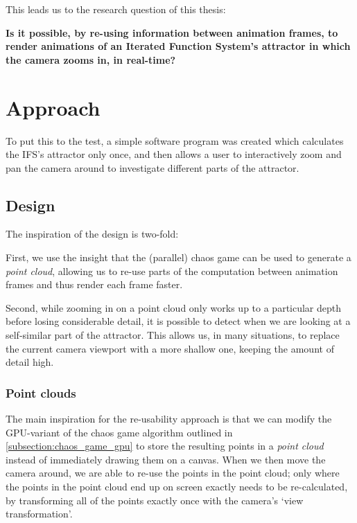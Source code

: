 \documentclass[11pt]{article}
\begin{document}
This leads us to the research question of this thesis:

\textbf{\textbf{Is it possible, by re-using information between animation frames, 
to render animations of an Iterated Function System's attractor in which the camera zooms in, in real-time?}}

\section{Approach}
\label{sec:orga42fad4}
\label{section:approach}

To put this to the test, a simple software program was created which calculates the IFS's attractor only once,
and then allows a user to interactively zoom and pan the camera around to investigate different parts of the attractor.

\subsection{Design}
\label{sec:org584834f}

The inspiration of the design is two-fold:

First, we use the insight that the (parallel) chaos game can be used to generate a \emph{point cloud}, allowing us to re-use parts of the computation between animation frames
and thus render each frame faster.

Second, while zooming in on a point cloud only works up to a particular depth before losing considerable detail, 
it is possible to detect when we are looking at a self-similar part of the attractor.
This allows us, in many situations, to replace the current camera viewport with a more shallow one, 
keeping the amount of detail high.

\subsubsection{Point clouds}
\label{sec:org517f5e8}

The main inspiration for the re-usability approach is that we can modify the GPU-variant of the chaos game algorithm outlined in \autoref{subsection:chaos_game_gpu}
to store the resulting points in a \emph{point cloud} instead of immediately drawing them on a canvas.
When we then move the camera around, we are able to re-use the points in the point cloud;
only where the points in the point cloud end up on screen exactly needs to be re-calculated, 
by transforming all of the points exactly once with the camera's `view transformation'.
\end{document}
